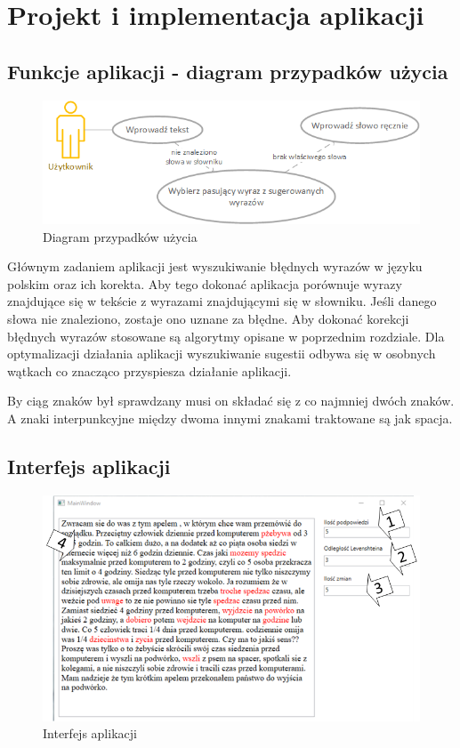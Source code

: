 \chapter{Projekt i implementacja aplikacji}

\section{Funkcje aplikacji - diagram przypadków użycia}

\begin{figure} [H]
	\centering
	\includegraphics[width=1\linewidth]{rozdzial03/diagram.png}
	\caption{Diagram przypadków użycia}
	\label{fig:diagUzycia}
\end{figure}

Głównym zadaniem aplikacji jest wyszukiwanie błędnych wyrazów w języku polskim oraz ich korekta. Aby tego dokonać aplikacja porównuje wyrazy znajdujące się w tekście z wyrazami znajdującymi się w słowniku. Jeśli danego słowa nie znaleziono, zostaje ono uznane za błędne. Aby dokonać korekcji błędnych wyrazów stosowane są algorytmy opisane w poprzednim rozdziale. Dla optymalizacji działania aplikacji wyszukiwanie sugestii odbywa się w osobnych wątkach co znacząco przyspiesza działanie aplikacji.

By ciąg znaków był sprawdzany musi on składać się z co najmniej dwóch znaków. A znaki interpunkcyjne między dwoma innymi znakami traktowane są jak spacja.

\section{Interfejs aplikacji}

\begin{figure} [H]
	\centering
	\includegraphics[width=1\linewidth]{rozdzial03/screen1_1.png}
	\caption{Interfejs aplikacji}
	\label{fig:interfejs}
\end{figure}

